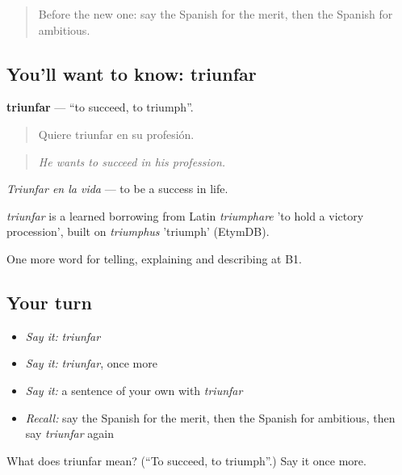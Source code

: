 \label{lesson:ES-C595-triunfar}



\begin{quote}
Before the new one: say the Spanish for the merit, then the Spanish for ambitious.
\end{quote}

\subsection*{You'll want to know: triunfar}
\textbf{triunfar} — \textquotedblleft{}to succeed, to triumph\textquotedblright{}.

\begin{quote}
Quiere triunfar en su profesión.
\end{quote}

\begin{quote}
\emph{He wants to succeed in his profession.}
\end{quote}

\emph{Triunfar en la vida} — to be a success in life.

\begin{cousinweb}
\emph{triunfar} is a learned borrowing from Latin \emph{triumphare} 'to hold a victory procession', built on \emph{triumphus} 'triumph' (EtymDB).
\end{cousinweb}

\begin{grammarlens}[title={What you've built}]
One more word for telling, explaining and describing at B1.
\end{grammarlens}

\subsection*{Your turn}
\begin{itemize}
\raggedright
  \item \emph{Say it:} \emph{triunfar}
  \item \emph{Say it:} \emph{triunfar}, once more
  \item \emph{Say it:} a sentence of your own with \emph{triunfar}
  \item \emph{Recall:} say the Spanish for the merit, then the Spanish for ambitious, then say \emph{triunfar} again
\end{itemize}

\begin{tcolorbox}[breakable,colback=teal!4,colframe=teal!35!black,title={Before you move on}]
What does triunfar mean? (\textquotedblleft{}To succeed, to triumph\textquotedblright{}.) Say it once more.
\end{tcolorbox}
